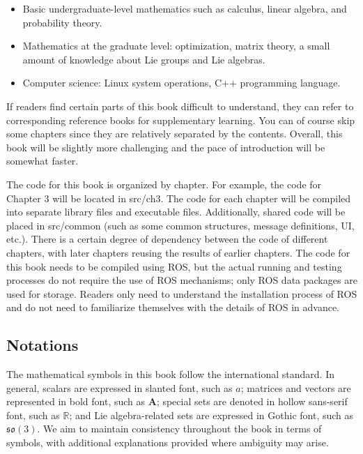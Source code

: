 \begin{itemize}
	\item Basic undergraduate-level mathematics such as calculus, linear algebra, and probability theory.
	\item Mathematics at the graduate level: optimization, matrix theory, a small amount of knowledge about Lie groups and Lie algebras.
	\item Computer science: Linux system operations, C++ programming language.
\end{itemize}

If readers find certain parts of this book difficult to understand, they can refer to corresponding reference books for supplementary learning. You can of course skip some chapters since they are relatively separated by the contents. Overall, this book will be slightly more challenging and the pace of introduction will be somewhat faster.

The code for this book is organized by chapter. For example, the code for Chapter 3 will be located in src/ch3. The code for each chapter will be compiled into separate library files and executable files. Additionally, shared code will be placed in src/common (such as some common structures, message definitions, UI, etc.). There is a certain degree of dependency between the code of different chapters, with later chapters reusing the results of earlier chapters. The code for this book needs to be compiled using ROS, but the actual running and testing processes do not require the use of ROS mechanisms; only ROS data packages are used for storage. Readers only need to understand the installation process of ROS and do not need to familiarize themselves with the details of ROS in advance.

\subsection*{Notations}
The mathematical symbols in this book follow the international standard. In general, scalars are expressed in slanted font, such as $a$; matrices and vectors are represented in bold font, such as $\mathbf{A}$; special sets are denoted in hollow sans-serif font, such as $\mathbb{R}$; and Lie algebra-related sets are expressed in Gothic font, such as $\mathfrak{so}(3)$. We aim to maintain consistency throughout the book in terms of symbols, with additional explanations provided where ambiguity may arise.

